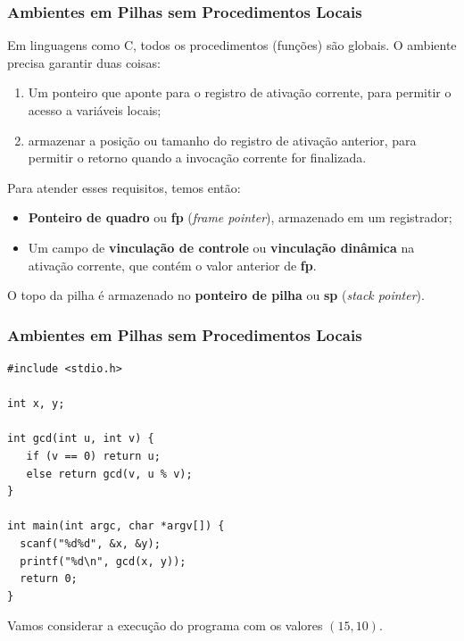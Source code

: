 \documentclass[table]{beamer}
\begin{document}
\begin{frame}
   \frametitle{Ambientes em Pilhas sem Procedimentos Locais}
   Em linguagens como C, todos os procedimentos (funções) são globais. O ambiente precisa garantir duas coisas:
   \begin{enumerate}
      \item Um ponteiro que aponte para o registro de ativação corrente, para permitir o acesso a variáveis locais;
      \item armazenar a posição ou tamanho do registro de ativação anterior, para permitir o retorno quando a invocação corrente for finalizada.
   \end{enumerate}
   Para atender esses requisitos, temos então:
   \begin{itemize}
      \item \textbf{Ponteiro de quadro} ou \textbf{fp} (\textit{frame pointer}), armazenado em um registrador;
      \item Um campo de \textbf{vinculação de controle} ou \textbf{vinculação dinâmica} na ativação corrente, que contém o valor anterior de \textbf{fp}.
   \end{itemize}
   O topo da pilha é armazenado no \textbf{ponteiro de pilha} ou \textbf{sp} (\textit{stack pointer}).
\end{frame}

\begin{frame}[fragile]
   \frametitle{Ambientes em Pilhas sem Procedimentos Locais}
   \begin{verbatim}
#include <stdio.h>

int x, y;

int gcd(int u, int v) {
   if (v == 0) return u;
   else return gcd(v, u % v);
}

int main(int argc, char *argv[]) {
  scanf("%d%d", &x, &y);
  printf("%d\n", gcd(x, y));
  return 0;
}
   \end{verbatim}
   Vamos considerar a execução do programa com os valores $(15,10)$.
\end{frame}
\end{document}
